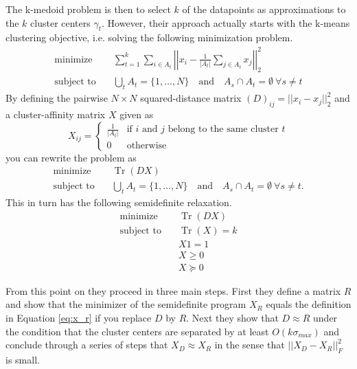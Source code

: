 \documentclass[10pt,a4paper]{article}
\DeclareMathOperator{\Tr}{Tr}
\begin{document}
The k-medoid problem is then to select $k$ of the datapoints as approximations to the $k$ cluster centers $\gamma_{t}$.
However, their approach actually starts with the k-means clustering objective, i.e. solving the following minimization problem.
\begin{align*}
  \text{minimize} \quad & \sum_{t = 1}^{k} \sum_{i \in A_{t}} \left|\left| x_{i} - \frac{1}{|A_{t}|} \sum_{j \in A_{t}} x_{j} \right|\right|_{2}^{2}\\
  \text{subject to} \quad & \bigcup_{t} A_{t} = \{ 1, \dots, N \} \quad \text{and} \quad A_{s} \cap A_{t} = \emptyset~\forall s \ne t
\end{align*}
By defining the pairwise $N \times N$ squared-distance matrix $(D)_{ij} = ||x_{i} - x_{j}||_{2}^{2}$ and a cluster-affinity matrix $X$ given as
\begin{equation}
  X_{ij} = \begin{cases}
    \frac{1}{|A_{t}|} & \text{if $i$ and $j$ belong to the same cluster $t$}\\
    0 & \text{otherwise}
  \end{cases}
  \label{eq:x_r}
\end{equation}
you can rewrite the problem as
\begin{align*}
  \text{minimize} \quad & \Tr(DX)\\
  \text{subject to} \quad & \bigcup_{t} A_{t} = \{ 1, \dots, N \} \quad \text{and} \quad A_{s} \cap A_{t} = \emptyset~\forall s \ne t.
\end{align*}
This in turn has the following semidefinite relaxation.
\begin{align*}
  \text{minimize} \quad & \Tr(DX)\\
  \text{subject to} \quad & \Tr(X) = k\\
                        & X1 = 1\\
                        & X \ge 0\\
                        & X \succeq 0
\end{align*}

From this point on they proceed in three main steps.
First they define a matrix $R$ and show that the minimizer of the semidefinite program $X_{R}$ equals the definition in Equation \eqref{eq:x_r} if you replace $D$ by $R$.
Next they show that $D \approx R$ under the condition that the cluster centers are separated by at least $O(k\sigma_{max})$ and conclude through a series of steps that $X_{D} \approx X_{R}$ in the sense that $||X_{D} - X_{R}||_{F}^{2}$ is small.
\end{document}
